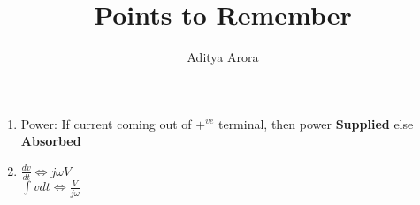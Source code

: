 \documentclass[10pt]{article}
\begin{document}
 
\title{Points to Remember}%
\author{Aditya Arora} %
\maketitle


\begin{enumerate}
\item Power: If current coming out of $+^{ve}$ terminal, then power \textbf{Supplied} else \textbf{Absorbed}
\item $\frac{dv}{dt} \Leftrightarrow j\omega V$\\
$\int v dt \Leftrightarrow  \frac{V}{j\omega}$


\end{enumerate}
\end{document}
